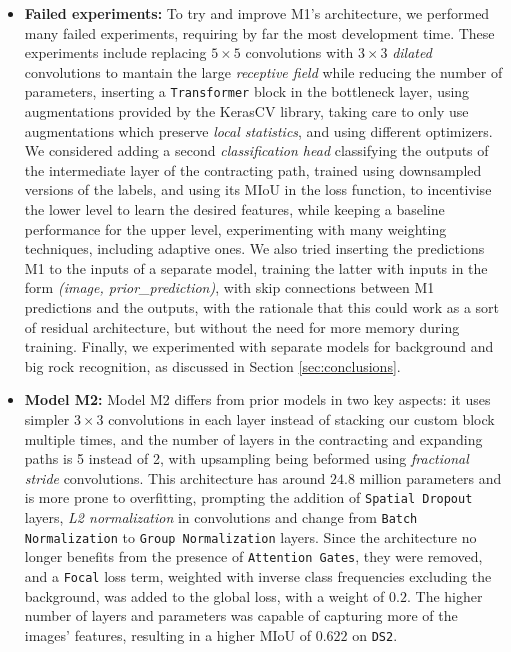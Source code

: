 \documentclass[11pt]{article}
\begin{document}
\begin{multicols}{2}
\begin{itemize}[leftmargin=*]
            \item \textbf{Failed experiments:} To try and improve M1's architecture, we performed many failed experiments, requiring by far the most development time. These experiments include replacing $5\times5$ convolutions with $3\times3$ \textit{dilated} convolutions to mantain the large \textit{receptive field} while reducing the number of parameters, inserting a \texttt{Transformer} %
            block in the bottleneck layer, using augmentations provided by the KerasCV library, taking care to only use augmentations which preserve \textit{local statistics}, and using different optimizers. We considered adding a second \textit{classification head} classifying the outputs of the intermediate layer of the contracting path, trained using downsampled versions of the labels, and using its MIoU in the loss function, to incentivise the lower level to learn the desired features, while keeping a baseline performance for the upper level, experimenting with many weighting techniques, including adaptive ones. We also tried inserting the predictions M1 to the inputs of a separate model, training the latter with inputs in the form \textit{(image, prior\_prediction)}, with skip connections between M1 predictions and the outputs, with the rationale that this could work as a sort of residual architecture, but without the need for more memory during training. Finally, we experimented with separate models for background and big rock recognition, as discussed in Section \ref{sec:conclusions}.
            \item \textbf{Model M2:} Model M2 differs from prior models in two key aspects: it uses simpler $3\times3$ convolutions in each layer instead of stacking our custom block multiple times, and the number of layers in the contracting and expanding paths is 5 instead of 2, with upsampling being beformed using \textit{fractional stride} convolutions. This architecture has around $24.8$ million parameters and is more prone to overfitting, prompting the addition of \texttt{Spatial Dropout} layers, \textit{L2 normalization} in convolutions and change from \texttt{Batch Normalization} to \texttt{Group Normalization} layers. Since the architecture no longer benefits from the presence of \texttt{Attention Gates}, they were removed, and a \texttt{Focal} loss term, weighted with inverse class frequencies excluding the background, was added to the global loss, with a weight of $0.2$. The higher number of layers and parameters was capable of capturing more of the images' features, resulting in a higher MIoU of $0.622$ on \texttt{DS2}.
      \end{itemize}


\end{multicols}
\end{document}
